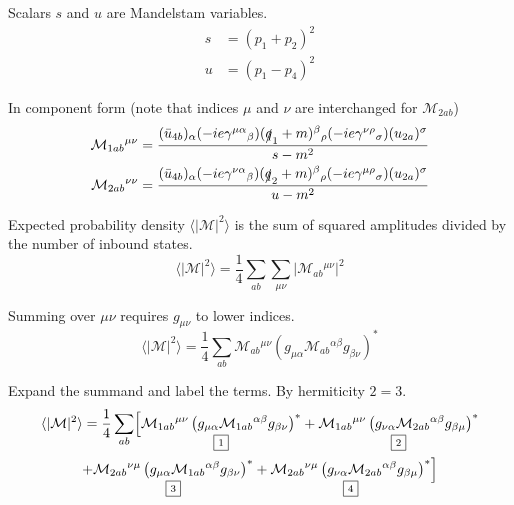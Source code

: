 Scalars $s$ and $u$ are Mandelstam variables.
\begin{align*}
s&=(p_1+p_2)^2
\\
u&=(p_1-p_4)^2
\end{align*}

In component form (note that indices $\mu$ and $\nu$ are interchanged for $\mathcal M_{2ab}$)
\begin{align*}
\mathcal M_{1ab}{}^{\mu\nu}&=\frac{
(\bar{u}_{4b})_\alpha
(-ie\gamma^{\mu\alpha}{}_\beta)
(\slashed{q}_1+m)^\beta{}_\rho
(-ie\gamma^{\nu\rho}{}_\sigma)
(u_{2a})^\sigma}{s-m^2}
\\
\mathcal M_{2ab}{}^{\nu\nu}&=\frac{
(\bar{u}_{4b})_\alpha
(-ie\gamma^{\nu\alpha}{}_\beta)
(\slashed{q}_2+m)^\beta{}_\rho
(-ie\gamma^{\mu\rho}{}_\sigma)
(u_{2a})^\sigma}{u-m^2}
\end{align*}

Expected probability density $\langle|\mathcal M|^2\rangle$
is the sum of squared amplitudes divided by the number of inbound states.
\begin{equation*}
\langle|\mathcal M|^2\rangle=\frac{1}{4}\sum_{ab}\sum_{\mu\nu}\bigl|\mathcal M_{ab}{}^{\mu\nu}\bigr|^2
\end{equation*}

Summing over $\mu\nu$ requires $g_{\mu\nu}$ to lower indices.
\begin{equation*}
\langle|\mathcal M|^2\rangle
=\frac{1}{4}\sum_{ab}\mathcal M_{ab}{}^{\mu\nu}
\left(g_{\mu\alpha}\mathcal M_{ab}{}^{\alpha\beta}g_{\beta\nu}\right)^*
\end{equation*}

Expand the summand and label the terms.
By hermiticity $\boxed{\scriptstyle2}=\boxed{\scriptstyle3}$.
\begin{multline*}
\langle|\mathcal{M}|^2\rangle
=\frac{1}{4}\sum_{ab}\Bigl[
\underset{\boxed{\scriptstyle1}}
{\mathcal M_{1ab}{}^{\mu\nu}\left(g_{\mu\alpha}\mathcal M_{1ab}{}^{\alpha\beta}g_{\beta\nu}\right)^*}
+
\underset{\boxed{\scriptstyle2}}
{\mathcal M_{1ab}{}^{\mu\nu}\left(g_{\nu\alpha}\mathcal M_{2ab}{}^{\alpha\beta}g_{\beta\mu}\right)^*}
\\
+
\underset{\boxed{\scriptstyle3}}
{\mathcal M_{2ab}{}^{\nu\mu}\left(g_{\mu\alpha}\mathcal M_{1ab}{}^{\alpha\beta}g_{\beta\nu}\right)^*}
+
\underset{\boxed{\scriptstyle4}}
{\mathcal M_{2ab}{}^{\nu\mu}\left(g_{\nu\alpha}\mathcal M_{2ab}{}^{\alpha\beta}g_{\beta\mu}\right)^*}
\Bigr]
\end{multline*}

